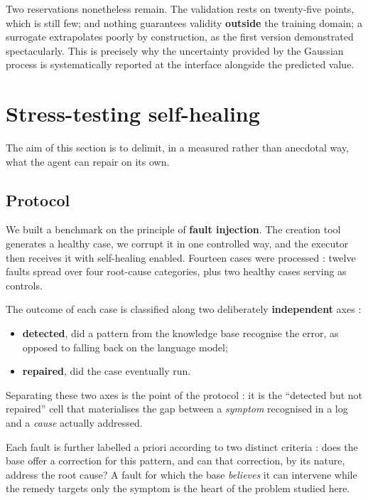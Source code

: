 Two reservations nonetheless remain. The validation rests on twenty-five points,
which is still few; and nothing guarantees validity \textbf{outside} the training domain; a surrogate extrapolates poorly by construction, as the first
version demonstrated spectacularly. This is precisely why the uncertainty
provided by the Gaussian process is systematically reported at the interface
alongside the predicted value.

\section{Stress-testing self-healing}
\label{sec:epreuve}

The aim of this section is to delimit, in a measured rather than anecdotal way,
what the agent can repair on its own.

\subsection{Protocol}

We built a benchmark on the principle of \textbf{fault injection}. The creation
tool generates a healthy case, we corrupt it in one controlled way, and the
executor then receives it with self-healing enabled.
Fourteen cases were processed : twelve faults spread over four root-cause
categories, plus two healthy cases serving as controls.

The outcome of each case is classified along two deliberately
\textbf{independent} axes :
\begin{itemize}
  \item \textbf{detected}, did a pattern from the knowledge base recognise the
    error, as opposed to falling back on the language model;
  \item \textbf{repaired}, did the case eventually run.
\end{itemize}

Separating these two axes is the point of the protocol : it is the ``detected but
not repaired'' cell that materialises the gap between a \emph{symptom}
recognised in a log and a \emph{cause} actually addressed.

Each fault is further labelled a priori according to two distinct criteria : does
the base offer a correction for this pattern, and can that correction, by its
nature, address the root cause? A fault for which the base \emph{believes} it
can intervene while the remedy targets only the symptom is the heart of the
problem studied here.

